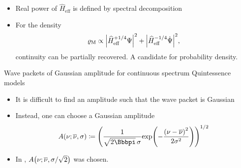 \documentclass[8pt]{beamer}
\begin{document}
\begin{frame}
\begin{itemize}
\begin{itemize}

\item Real power of $\widehat{H}_\text{eff}$ is defined by spectral decomposition

\item For the density
\begin{align}
\varrho_\text{M} \propto
{\left|\widehat{H}_\text{eff}^{+1/4}\Psi\right|}^2+
{\left|\widehat{H}_\text{eff}^{-1/4}\dot{\Psi}\right|}^2,
\end{align}
continuity can be partially recovered. A candidate for
\alert{probability density}.


\end{itemize}

\end{itemize}
\end{frame}


\begin{frame}%
{Wave packets of Gaussian amplitude for continuous spectrum}%
{Quintessence models}
\begin{itemize}
\item It is difficult to find an amplitude such that the wave packet is
Gaussian
\item Instead, one can choose a Gaussian amplitude
\begin{align}
\rfun{A}{\nu; \overline{\nu},\sigma} \coloneqq
\rbr{\frac{1}{\sqrt{2\pp}\,\sigma}\rfun{\exp}{
-\frac{\rbr{\nu-\overline{\nu}}^2}{2\sigma^2}}}^{1/2}
\end{align}

\item In ,
${A}\mathopen{}\left(\nu;\overline{\nu},\sigma/\sqrt{2}\right)\mathclose{}$ was chosen.

\end{itemize}
\end{frame}
\end{document}
